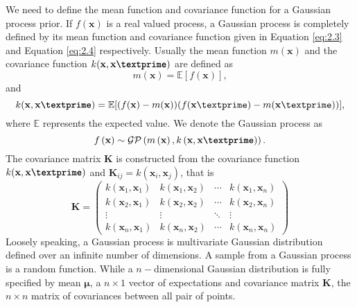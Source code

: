 We need to define the mean function and covariance function for a Gaussian process prior. If $f(\textbf{x})$ is a real valued process, a Gaussian process is completely defined by its mean function and covariance function given in Equation \ref{eq:2.3} and Equation \ref{eq:2.4} respectively. Usually the mean function $m(\textbf{x})$  and the covariance function $k(\textbf{x},\textbf{x\textprime})$ are defined as
\begin{equation} \label{eq:2.3}
m(\textbf{x})= \mathbb{E}[f(\textbf{x})],
\end{equation}
and
\begin{equation} \label{eq:2.4}
k(\textbf{x},\textbf{x\textprime})= 
\mathbb{E}[(f(\textbf{x})-m(\textbf{x}))(f(\textbf{x}\textprime)-m(\textbf{x}\textprime))],
\end{equation}
where $\mathbb{E}$ represents the expected value. We denote the Gaussian process as
\begin{equation} \label{eq:GP}
f\left(\textbf{x} \right)\sim \mathcal{GP} \left(m \left(\textbf{x}\right), k \left(\textbf{x},\textbf{x\textprime}\right) \right).
\end{equation}
The covariance matrix $\textbf{K}$ is constructed from the covariance function $k(\textbf{x},\textbf{x\textprime})$ and $\textbf{K}_{ij}=k\left(\textbf{x}_i,\textbf{x}_j\right)$, that is 
\begin{equation} \label{eq:GP_cov_mat}
\textbf{K} = 
 \begin{pmatrix}
  k\left(\textbf{x}_1,\textbf{x}_1\right) & k\left(\textbf{x}_1,\textbf{x}_2\right) & \cdots & k\left(\textbf{x}_1,\textbf{x}_n\right) \\
  k\left(\textbf{x}_2,\textbf{x}_1\right) & k\left(\textbf{x}_2,\textbf{x}_2\right) & \cdots & k\left(\textbf{x}_2,\textbf{x}_n\right) \\
  \vdots  & \vdots  & \ddots & \vdots  \\
  k\left(\textbf{x}_n,\textbf{x}_1\right) & k\left(\textbf{x}_n,\textbf{x}_2\right) & \cdots & k\left(\textbf{x}_n,\textbf{x}_n\right)
 \end{pmatrix}
\end{equation}
Loosely speaking, a Gaussian process is multivariate Gaussian distribution defined over an infinite number of dimensions. A sample from a Gaussian process is a random function. While a $n-$dimensional Gaussian distribution is fully specified by mean $\boldsymbol\mu$, a $n \times 1$ vector of expectations and covariance matrix $\textbf{K}$, the $n \times n$ matrix of covariances between all pair of points.

